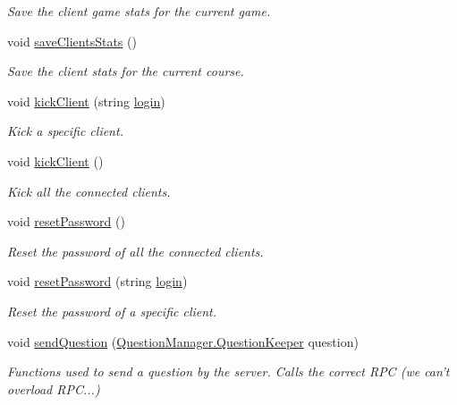 \begin{DoxyCompactItemize}
\begin{DoxyCompactList}\small\item\em Save the client game stats for the current game.\end{DoxyCompactList}\item 
void \hyperlink{class_c3_p_o_network_manager_a49489d58ccbae0c90d713368f28fea59}{save\-Clients\-Stats} ()
\begin{DoxyCompactList}\small\item\em Save the client stats for the current course.\end{DoxyCompactList}\item 
void \hyperlink{class_c3_p_o_network_manager_a33c2ad0b2b842b0b2d4ee0e8659fb3a6}{kick\-Client} (string \hyperlink{class_c3_p_o_network_manager_a24278174f3f3777ab191c1d174dccd8f}{login})
\begin{DoxyCompactList}\small\item\em Kick a specific client.\end{DoxyCompactList}\item 
void \hyperlink{class_c3_p_o_network_manager_a5e40d1b7ec87c36b5c2b4df3a5ae10d2}{kick\-Client} ()
\begin{DoxyCompactList}\small\item\em Kick all the connected clients.\end{DoxyCompactList}\item 
void \hyperlink{class_c3_p_o_network_manager_a06b5aed3626f1aeef8cc14eb4bfde62a}{reset\-Password} ()
\begin{DoxyCompactList}\small\item\em Reset the password of all the connected clients.\end{DoxyCompactList}\item 
void \hyperlink{class_c3_p_o_network_manager_abcce9f6114ed883cc0a1d39d549c4f77}{reset\-Password} (string \hyperlink{class_c3_p_o_network_manager_a24278174f3f3777ab191c1d174dccd8f}{login})
\begin{DoxyCompactList}\small\item\em Reset the password of a specific client.\end{DoxyCompactList}\item 
void \hyperlink{class_c3_p_o_network_manager_a531d05f78aa99cd87b6a61cd4488fd57}{send\-Question} (\hyperlink{class_question_manager_1_1_question_keeper}{Question\-Manager.\-Question\-Keeper} question)
\begin{DoxyCompactList}\small\item\em Functions used to send a question by the server. Calls the correct R\-P\-C (we can't overload R\-P\-C...)\end{DoxyCompactList}\item 

\end{DoxyCompactItemize}
